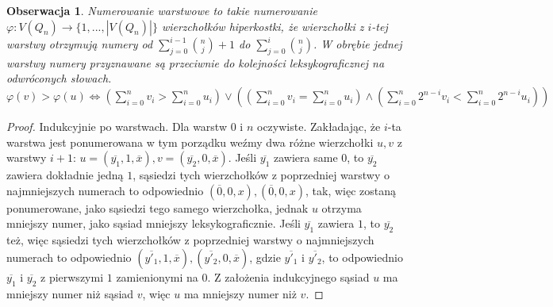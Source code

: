 \documentclass{pracamgr}
\newtheorem{observation}[theorem]{Obserwacja}
\begin{document}
    \begin{observation}\label{numerowanie warstwowe 2}
     Numerowanie warstwowe to takie numerowanie $\varphi:V(Q_n)\rightarrow\{1,...,|V(Q_n)|\}$ wierzchołków hiperkostki,
     że wierzchołki z $i$-tej warstwy otrzymują numery od $\sum_{j=0}^{i-1}{n\choose j}+1$ do $\sum_{j=0}^{i}{n\choose j}$.
     W obrębie jednej warstwy numery przyznawane są przeciwnie do kolejności leksykograficznej na odwróconych słowach.
     $\varphi(v)>\varphi(u)\Leftrightarrow (\sum_{i=0}^n v_i>\sum_{i=0}^n u_i)
     \vee((\sum_{i=0}^n v_i=\sum_{i=0}^n u_i)\wedge(\sum_{i=0}^n2^{n-i}v_i<\sum_{i=0}^n2^{n-i}u_i))$
    \end{observation}
    \begin{proof}
     Indukcyjnie po warstwach.\newline
     Dla warstw $0$ i $n$ oczywiste.\newline
     Zakładając, że $i$-ta warstwa jest ponumerowana w tym porządku weźmy dwa różne wierzchołki $u,v$ z warstwy $i+1$:
     $u=(\overline{y_1},1,\overline{x}),v=(\overline{y_2},0,\overline{x})$.\newline
     Jeśli $\overline{y_1}$ zawiera same $0$, to $\overline{y_2}$ zawiera dokładnie jedną $1$, sąsiedzi tych wierzchołków z poprzedniej warstwy
     o najmniejszych numerach to odpowiednio $(\overline{0},0,x),(\overline{0},0,x)$,
     tak, więc zostaną ponumerowane, jako sąsiedzi tego samego wierzchołka, jednak $u$ otrzyma mniejszy numer, jako sąsiad mniejszy leksykograficznie.\newline
     Jeśli $\overline{y_1}$ zawiera $1$, to $\overline{y_2}$ też, więc sąsiedzi tych wierzchołków z poprzedniej warstwy
     o najmniejszych numerach to odpowiednio $(\overline{y'_1},1,\overline{x}),(\overline{y'_2},0,\overline{x})$, gdzie $\overline{y'_1}$ i $\overline{y'_2}$,
     to odpowiednio $\overline{y_1}$ i $\overline{y_2}$ z pierwszymi $1$ zamienionymi na $0$. Z założenia indukcyjnego sąsiad $u$ ma mniejszy numer niż sąsiad $v$,
     więc $u$ ma mniejszy numer niż $v$.
    \end{proof}
\end{document}
